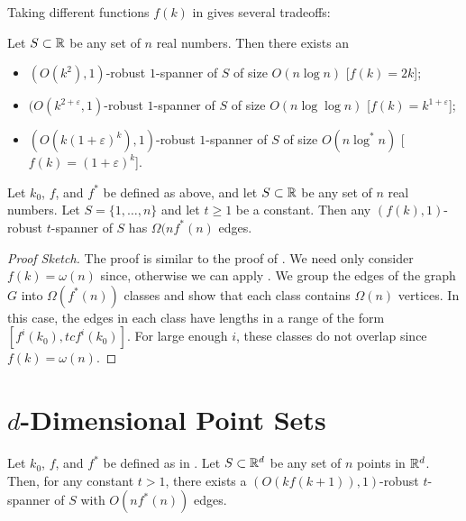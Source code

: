 \documentclass{patmorin}
\begin{document}
Taking different functions $f(k)$ in  gives several tradeoffs:

\begin{cor}
Let $S\subset \mathbb{R}$ be any set of $n$ real numbers.  Then there exists an
\begin{itemize}
  \item $(O(k^2),1)$-robust $1$-spanner of $S$ of size $O(n\log n)$
  [$f(k)=2k$];
  \item $(O(k^{2+\varepsilon},1)$-robust $1$-spanner of $S$ of size
  $O(n\log\log n)$ [$f(k)=k^{1+\varepsilon}$];
  \item $(O(k(1+\varepsilon)^k),1)$-robust $1$-spanner of $S$ of size
  $O(n\log^* n)$ [$f(k)=(1+\varepsilon)^k$].
\end{itemize}
\end{cor}


\begin{thm}
Let $k_0$, $f$, and $f^*$ be defined as above, and let $S\subset \mathbb{R}$
be any set of $n$ real numbers.  Let $S=\{1,\ldots,n\}$ and let $t\ge
1$ be a constant.  Then any $(f(k),1)$-robust $t$-spanner of $S$ has
$\Omega(nf^*(n)$ edges.
\end{thm}

\begin{proof}[Proof Sketch]
The proof is similar to the proof of .
We need only consider $f(k)=\omega(n)$ since, otherwise we can apply
.  We group the edges of the graph $G$ into
$\Omega(f^*(n))$ classes and show that each class contains $\Omega(n)$
vertices.  In this case, the edges in each class have lengths in a
range of the form $[f^i(k_0),tcf^{i}(k_0)]$.  For large enough $i$,
these classes do not overlap since $f(k)=\omega(n)$.
\end{proof}





\section{$d$-Dimensional Point Sets}

\begin{thm}
Let $k_0$, $f$, and $f^*$ be defined as in .
Let $S\subset \mathbb{R}^d$ be any set of $n$ points in $\mathbb{R}^d$.  Then, for any
constant $t>1$,  there exists a $(O(kf(k+1)),1)$-robust $t$-spanner of $S$
with $O(nf^*(n))$ edges.
\end{thm}
\end{document}
